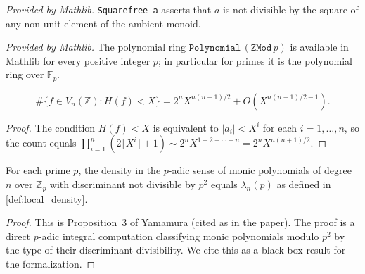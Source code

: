 \begin{lemma}
  \label{lem:squarefree_mathlib}
  \mathlibok
  \textit{Provided by Mathlib.}
  \texttt{Squarefree a} asserts that \(a\) is not divisible by the
  square of any non-unit element of the ambient monoid.
\end{lemma}

\begin{lemma}
  \label{lem:zmod_poly_mathlib}
  \mathlibok
  \textit{Provided by Mathlib.}
  The polynomial ring \(\mathtt{Polynomial}\,(\mathtt{ZMod}\,p)\) is
  available in Mathlib for every positive integer \(p\); in particular
  for primes it is the polynomial ring over \(\mathbb{F}_p\).
\end{lemma}


\begin{lemma}
  \label{lem:count_all_polys}
  \[
    \#\bigl\{f\in V_n(\mathbb{Z}) : H(f)<X\bigr\}
    = 2^n X^{n(n+1)/2} + O\!\left(X^{n(n+1)/2-1}\right).
  \]
\end{lemma}
\begin{proof}
  The condition \(H(f)<X\) is equivalent to \(|a_i|<X^i\) for each
  \(i=1,\ldots,n\), so the count equals
  \(\prod_{i=1}^n (2\lfloor X^i\rfloor+1)\sim 2^n X^{1+2+\cdots+n}=2^n X^{n(n+1)/2}\).
\end{proof}

\begin{lemma}
  \label{lem:yamamura_local}
  For each prime \(p\), the density in the \(p\)-adic sense of monic
  polynomials of degree \(n\) over \(\mathbb{Z}_p\) with discriminant
  not divisible by \(p^2\) equals \(\lambda_n(p)\) as defined in
  \cref{def:local_density}.
\end{lemma}
\begin{proof}
  This is Proposition~3 of Yamamura (cited as \cite{Yamamura2} in the
  paper).  The proof is a direct \(p\)-adic integral computation
  classifying monic polynomials modulo \(p^2\) by the type of their
  discriminant divisibility.  We cite this as a black-box result for
  the formalization.
\end{proof}

